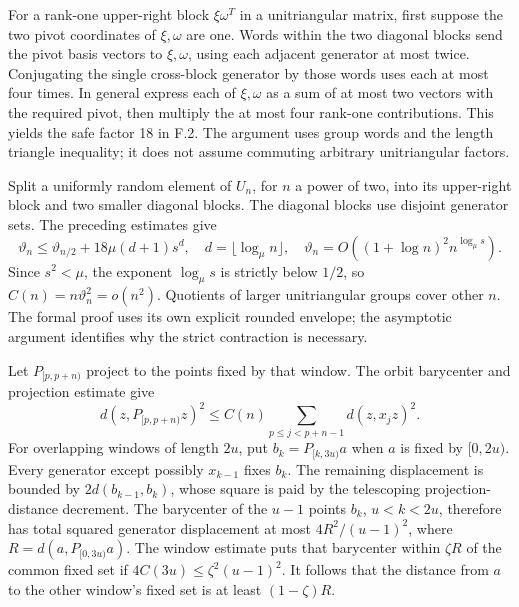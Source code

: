 \documentclass[11pt,letterpaper]{article}
\theoremstyle{definition}\newtheorem{definition}[theorem]{Definition}\newtheorem{example}[theorem]{Example}
\theoremstyle{remark}\newtheorem{remark}[theorem]{Remark}
\begin{document}
For a rank-one upper-right block $\xi\omega^T$ in a unitriangular matrix, first suppose the two pivot coordinates of $\xi,\omega$ are one. Words within the two diagonal blocks send the pivot basis vectors to $\xi,\omega$, using each adjacent generator at most twice. Conjugating the single cross-block generator by those words uses each at most four times. In general express each of $\xi,\omega$ as a sum of at most two vectors with the required pivot, then multiply the at most four rank-one contributions. This yields the safe factor 18 in F.2. The argument uses group words and the length triangle inequality; it does not assume commuting arbitrary unitriangular factors.

Split a uniformly random element of $U_n$, for $n$ a power of two, into its upper-right block and two smaller diagonal blocks. The diagonal blocks use disjoint generator sets. The preceding estimates give
\[
 \vartheta_n\le\vartheta_{n/2}+18\mu(d+1)s^d,
 \quad d=\lfloor\log_\mu n\rfloor,
 \quad \vartheta_n=O((1+\log n)^2n^{\log_\mu s}).
\]
Since $s^2<\mu$, the exponent $\log_\mu s$ is strictly below $1/2$, so $C(n)=n\vartheta_n^2=o(n^2)$. Quotients of larger unitriangular groups cover other $n$. The formal proof uses its own explicit rounded envelope; the asymptotic argument identifies why the strict contraction is necessary.

Let $P_{[p,p+n)}$ project to the points fixed by that window. The orbit barycenter and projection estimate give
\[
 d(z,P_{[p,p+n)}z)^2\le C(n)\sum_{p\le j<p+n-1}d(z,x_jz)^2.
\]
For overlapping windows of length $2u$, put $b_k=P_{[k,3u)}a$ when $a$ is fixed by $[0,2u)$. Every generator except possibly $x_{k-1}$ fixes $b_k$. The remaining displacement is bounded by $2d(b_{k-1},b_k)$, whose square is paid by the telescoping projection-distance decrement. The barycenter of the $u-1$ points $b_k$, $u<k<2u$, therefore has total squared generator displacement at most $4R^2/(u-1)^2$, where $R=d(a,P_{[0,3u)}a)$. The window estimate puts that barycenter within $\zeta R$ of the common fixed set if $4C(3u)\le\zeta^2(u-1)^2$. It follows that the distance from $a$ to the other window's fixed set is at least $(1-\zeta)R$.
\end{document}
